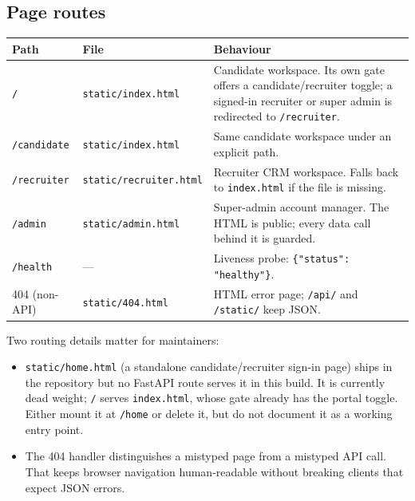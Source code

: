 \documentclass[11pt,a4paper]{article}
\newcommand{\file}[1]{\texttt{\small #1}}
\newcommand{\code}[1]{\texttt{#1}}
\begin{document}
\subsection{Page routes}
\begin{center}
\begin{tabular}{@{}lp{3.8cm}p{8.2cm}@{}}
\toprule
\textbf{Path} & \textbf{File} & \textbf{Behaviour}\\
\midrule
\file{/} & \file{static/index.html} &
  Candidate workspace. Its own gate offers a candidate/recruiter toggle; a
  signed-in recruiter or super admin is redirected to \file{/recruiter}.\\
\file{/candidate} & \file{static/index.html} &
  Same candidate workspace under an explicit path.\\
\file{/recruiter} & \file{static/recruiter.html} &
  Recruiter CRM workspace. Falls back to \file{index.html} if the file is
  missing.\\
\file{/admin} & \file{static/admin.html} &
  Super-admin account manager. The HTML is public; every data call behind it
  is guarded.\\
\file{/health} & --- & Liveness probe: \code{\{"status": "healthy"\}}.\\
404 (non-API) & \file{static/404.html} &
  HTML error page; \file{/api/} and \file{/static/} keep JSON.\\
\bottomrule
\end{tabular}
\end{center}

Two routing details matter for maintainers:
\begin{itemize}[leftmargin=2em]
  \item \file{static/home.html} (a standalone candidate/recruiter sign-in
        page) ships in the repository but no FastAPI route serves it in this
        build. It is currently dead weight; \file{/} serves
        \file{index.html}, whose gate already has the portal toggle. Either
        mount it at \file{/home} or delete it, but do not document it as a
        working entry point.
  \item The 404 handler distinguishes a mistyped page from a mistyped API
        call. That keeps browser navigation human-readable without breaking
        clients that expect JSON errors.
\end{itemize}
\end{document}
